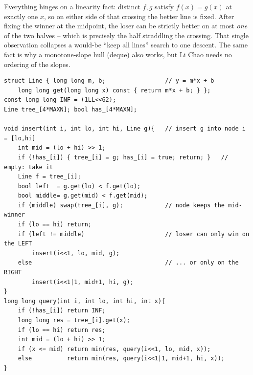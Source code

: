 \begin{insightbox}
Everything hinges on a linearity fact: distinct \(f,g\) satisfy \(f(x)=g(x)\) at
exactly one \(x\), so on either side of that crossing the better line is fixed.
After fixing the winner at the midpoint, the loser can be strictly better on at
most \emph{one} of the two halves -- which is precisely the half straddling the
crossing.  That single observation collapses a would-be ``keep all lines''
search to one descent.  The same fact is why a monotone-slope hull (deque) also
works, but Li Chao needs no ordering of the slopes.
\end{insightbox}

\begin{lstlisting}[caption={Li Chao line container over the integer domain [lo,hi]: insert a line keeping the mid-winner, query the pointwise minimum along the root-to-leaf path. ASCII only}, label={lst:c29-lichao}]
struct Line { long long m, b;                 // y = m*x + b
    long long get(long long x) const { return m*x + b; } };
const long long INF = (1LL<<62);
Line tree_[4*MAXN]; bool has_[4*MAXN];

void insert(int i, int lo, int hi, Line g){   // insert g into node i = [lo,hi]
    int mid = (lo + hi) >> 1;
    if (!has_[i]) { tree_[i] = g; has_[i] = true; return; }   // empty: take it
    Line f = tree_[i];
    bool left  = g.get(lo) < f.get(lo);
    bool middle= g.get(mid) < f.get(mid);
    if (middle) swap(tree_[i], g);            // node keeps the mid-winner
    if (lo == hi) return;
    if (left != middle)                       // loser can only win on the LEFT
        insert(i<<1, lo, mid, g);
    else                                      // ... or only on the RIGHT
        insert(i<<1|1, mid+1, hi, g);
}
long long query(int i, int lo, int hi, int x){
    if (!has_[i]) return INF;
    long long res = tree_[i].get(x);
    if (lo == hi) return res;
    int mid = (lo + hi) >> 1;
    if (x <= mid) return min(res, query(i<<1, lo, mid, x));
    else          return min(res, query(i<<1|1, mid+1, hi, x));
}
\end{lstlisting}

